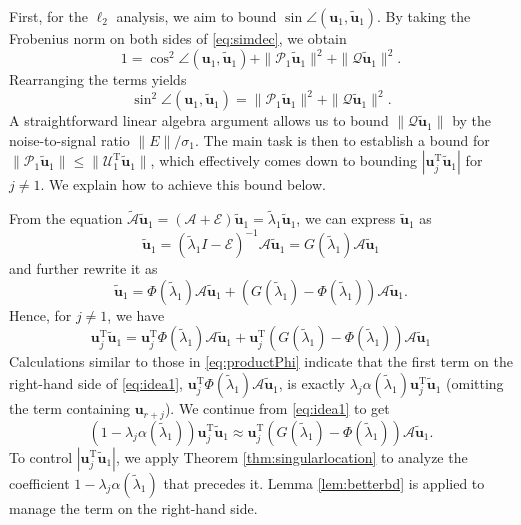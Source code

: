 \documentclass[reqno]{amsart}
\newcommand{\T}{\mathrm{T}}
\theoremstyle{plain}
\theoremstyle{definition}
\begin{document}
First, for the $\ell_2$ analysis, we aim to bound $\sin \angle ({\mathbf u}_1, \widetilde{\mathbf u}_1)$. By taking the Frobenius norm on both sides of \eqref{eq:simdec}, we obtain
$$1 = \cos^2  \angle ({\mathbf u}_1, \widetilde{\mathbf u}_1) + \| \mathcal P_1 \widetilde{\mathbf u}_1\|^2 + \|\mathcal Q \widetilde{\mathbf u}_1\|^2.$$
Rearranging the terms yields
$$\sin^2 \angle ({\mathbf u}_1, \widetilde{\mathbf u}_1) = \| \mathcal P_1 \widetilde{\mathbf u}_1\|^2 + \|\mathcal Q \widetilde{\mathbf u}_1\|^2.$$
A straightforward linear algebra argument allows us to bound  $\|\mathcal Q \widetilde{\mathbf u}_1\|$ by the noise-to-signal ratio $\|E\|/\sigma_1$. The main task is then to establish a bound for $\| \mathcal P_1 \widetilde{\mathbf u}_1\| \le \|\mathcal U_1^\T\widetilde{\mathbf u}_1\|$, which effectively comes down to bounding $|{\mathbf u}_j^\T \widetilde{\mathbf u}_1|$ for $j\neq 1$. We explain how to achieve this bound below.

From the equation $\widetilde{\mathcal A} \widetilde{\mathbf u}_1 = (\mathcal A + \mathcal E) \widetilde{\mathbf u}_1 = \widetilde{\lambda}_1 \widetilde{\mathbf u}_1$, we can express $\widetilde{\mathbf u}_1$ as
$$ \widetilde{\mathbf u}_1 =(\widetilde \lambda_1 I - \mathcal E)^{-1} \mathcal A \widetilde{\mathbf u}_1=G(\widetilde \lambda_1) \mathcal A \widetilde{\mathbf u}_1$$ and further rewrite it as 
$$ \widetilde{\mathbf u}_1 = \Phi(\widetilde \lambda_1) \mathcal A \widetilde{\mathbf u}_1 + \left(G(\widetilde \lambda_1)-\Phi(\widetilde \lambda_1) \right) \mathcal A \widetilde{\mathbf u}_1.$$
Hence, for $j\neq 1$, we have
\begin{equation}\label{eq:idea1}
{\mathbf u}_j^\T \widetilde{\mathbf u}_1={\mathbf u}_j^\T \Phi(\widetilde \lambda_1) \mathcal A \widetilde{\mathbf u}_1 + {\mathbf u}_j^\T\left(G(\widetilde \lambda_1)-\Phi(\widetilde \lambda_1) \right) \mathcal A \widetilde{\mathbf u}_1
\end{equation}
Calculations similar to those in \eqref{eq:productPhi} indicate that the first term on the right-hand side of \eqref{eq:idea1}, ${\mathbf u}_j^\T \Phi(\widetilde \lambda_1) \mathcal A \widetilde{\mathbf u}_1$, is exactly $\lambda_j \alpha(\widetilde \lambda_1){\mathbf u}_j^\T \widetilde{\mathbf u}_1$ (omitting the term containing ${\mathbf u}_{r+j}$). We continue from \eqref{eq:idea1} to get 
$$\left(1-\lambda_j \alpha(\widetilde \lambda_1) \right) {\mathbf u}_j^\T \widetilde{\mathbf u}_1 \approx {\mathbf u}_j^\T \left(G(\widetilde \lambda_1)-\Phi(\widetilde \lambda_1) \right) \mathcal A \widetilde{\mathbf u}_1.$$
To control $|{\mathbf u}_j^\T \widetilde{\mathbf u}_1|$, we apply Theorem \ref{thm:singularlocation} to analyze the coefficient $1-\lambda_j \alpha(\widetilde \lambda_1)$ that precedes it. Lemma \ref{lem:betterbd} is applied to manage the term on the right-hand side. 
\end{document}
